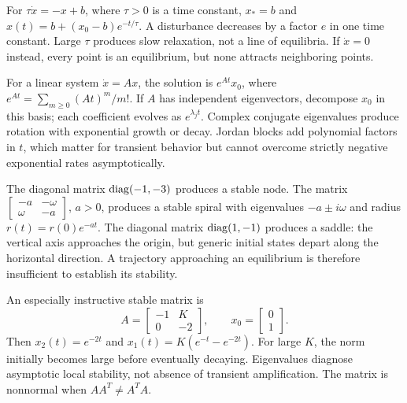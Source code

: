 \begin{example}
For $\tau\dot x=-x+b$, where $\tau>0$ is a time constant, $x_*=b$ and $x(t)=b+(x_0-b)e^{-t/\tau}$. A disturbance decreases by a factor $e$ in one time constant. Large $\tau$ produces slow relaxation, not a line of equilibria. If $\dot x=0$ instead, every point is an equilibrium, but none attracts neighboring points.
\end{example}

For a linear system $\dot x=Ax$, the solution is $e^{At}x_0$, where $e^{At}=\sum_{m\geq0}(At)^m/m!$. If $A$ has independent eigenvectors, decompose $x_0$ in this basis; each coefficient evolves as $e^{\lambda_jt}$. Complex conjugate eigenvalues produce rotation with exponential growth or decay. Jordan blocks add polynomial factors in $t$, which matter for transient behavior but cannot overcome strictly negative exponential rates asymptotically.

\begin{example}
The diagonal matrix $\operatorname{diag}(-1,-3)$ produces a stable node. The matrix $\left[\begin{smallmatrix}-a&-\omega\\\omega&-a\end{smallmatrix}\right]$, $a>0$, produces a stable spiral with eigenvalues $-a\pm i\omega$ and radius $r(t)=r(0)e^{-at}$. The diagonal matrix $\operatorname{diag}(1,-1)$ produces a saddle: the vertical axis approaches the origin, but generic initial states depart along the horizontal direction. A trajectory approaching an equilibrium is therefore insufficient to establish its stability.
\end{example}

An especially instructive stable matrix is
\begin{equation}\label{eq:nonnormal}
A=\begin{bmatrix}-1&K\\0&-2\end{bmatrix},\qquad
x_0=\begin{bmatrix}0\\1\end{bmatrix}.
\end{equation}
Then $x_2(t)=e^{-2t}$ and $x_1(t)=K(e^{-t}-e^{-2t})$. For large $K$, the norm initially becomes large before eventually decaying. Eigenvalues diagnose asymptotic local stability, not absence of transient amplification. The matrix is nonnormal when $AA^T\ne A^TA$.

